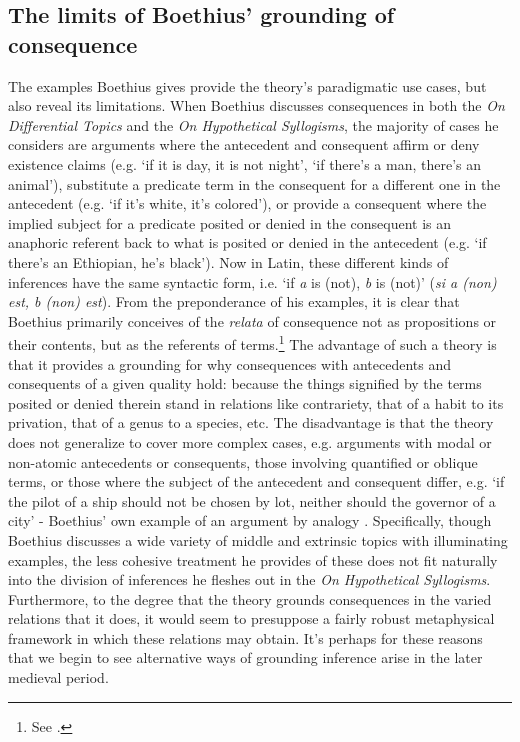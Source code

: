 \documentclass[a4paper, 11pt]{article}
\begin{document}
\subsection{The limits of Boethius' grounding of consequence}
The examples Boethius gives provide the theory's paradigmatic use cases, but also reveal its limitations. When Boethius discusses consequences in both the \emph{On Differential Topics} and the \emph{On Hypothetical Syllogisms}, the majority of cases he considers are arguments where the antecedent and consequent affirm or deny existence claims (e.g. `if it is day, it is not night', `if there's a man, there's an animal'), substitute a predicate term in the consequent for a different one in the antecedent (e.g. `if it's white, it's colored'), or provide a consequent where the implied subject for a predicate posited or denied in the consequent is an anaphoric referent back to what is posited or denied in the antecedent (e.g. `if there's an Ethiopian, he's black'). Now in Latin, these different kinds of inferences have the same syntactic form, i.e.  `if \emph{a} is (not), \emph{b} is (not)' (\emph{si a (non) est, b (non) est}). From the preponderance of his examples, it is clear that Boethius primarily conceives of the \emph{relata} of consequence not as propositions or their contents, but as the referents of terms.\footnote{See \autocite{Martin2007,Bosman2018}.} The advantage of such a theory is that it provides a grounding for why consequences with antecedents and consequents of a given quality hold: because the things signified by the terms posited or denied therein stand in relations like contrariety, that of a habit to its privation, that of a genus to a species, etc. The disadvantage is that the theory does not generalize to cover more complex cases, e.g. arguments with modal or non-atomic antecedents or consequents, those involving quantified or oblique terms, or those where the subject of the antecedent and consequent differ, e.g. `if the pilot of a ship should not be chosen by lot, neither should the governor of a city' - Boethius' own example of an argument by analogy \autocite[1191A-B]{BDT}. Specifically, though Boethius discusses a wide variety of middle and extrinsic topics with illuminating examples, the less cohesive treatment he provides of these does not fit naturally into the division of inferences he fleshes out in the \emph{On Hypothetical Syllogisms}. Furthermore, to the degree that the theory grounds consequences in the varied relations that it does, it would seem to presuppose a fairly robust metaphysical framework in which these relations may obtain. It's perhaps for these reasons that we begin to see alternative ways of grounding inference arise in the later medieval period.
\end{document}
